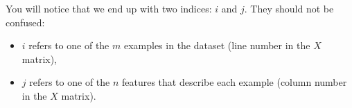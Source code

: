 You will notice that we end up with two indices: $i$ and $j$. They should not be confused:
\begin{itemize}
    \item $i$ refers to one of the $m$ examples in the dataset (line number in the $X$ matrix),
    \item $j$ refers to one of the $n$ features that describe each example (column number in the $X$ matrix).
\end{itemize}
